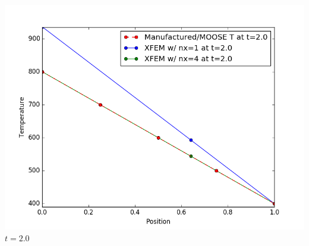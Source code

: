 \documentclass[]{beamer}
\begin{document}
\begin{frame}[t]
\begin{columns}
\begin{center}
			\includegraphics[scale=0.17]{figures/1D_xy_ls1mat_u_vs_x_20}\\
			$t=2.0$
			\end{center}
	\end{columns}
\end{frame}
\end{document}
